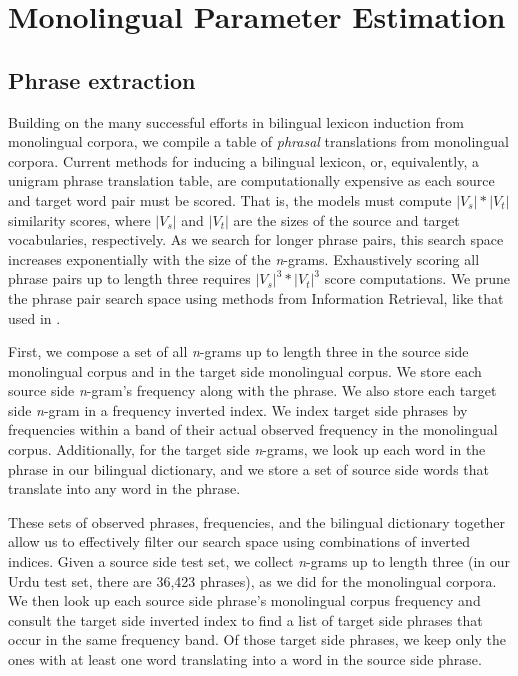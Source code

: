 \documentclass[11pt]{article}
\newcommand{\mnote}[1]{\marginpar{%
  \vskip-\baselineskip
  \raggedright\footnotesize
  \itshape\hrule\smallskip\tiny{#1}\par\smallskip\hrule}}
\newcommand{\mtodo}[1]{\mnote{\textcolor{red}{#1}}}
\begin{document}

\section{Monolingual Parameter Estimation} \label{sect:mono}

\subsection{Phrase extraction}  \label{sect:extract}

Building on the many successful efforts in bilingual lexicon induction from monolingual corpora, we compile a table of {\it phrasal} translations from monolingual corpora. Current methods for inducing a bilingual lexicon, or, equivalently, a unigram phrase translation table, are computationally expensive as each source and target word pair must be scored. That is, the models must  compute $|V_s| * |V_t|$ similarity scores, where $|V_s|$ and $|V_t|$ are the sizes of the source and target vocabularies, respectively. As we search for longer phrase pairs, this search space increases exponentially with the size of the  {\it n}-grams. Exhaustively scoring all phrase pairs up to length three requires $|V_s|^3 * |V_t|^3 $ score computations. We prune the phrase pair search space using methods from Information Retrieval, like that used in . 

First, we compose a set of all {\it n}-grams up to length three in the source side monolingual corpus and in the target side monolingual corpus. We store each source side {\it n}-gram's frequency along with the phrase. We also store each target side {\it n}-gram in a frequency inverted index. We index target side phrases by frequencies within a band of their actual observed frequency in the monolingual corpus. Additionally, for the target side {\it n}-grams, we look up each word in the phrase in our bilingual dictionary, and we store a set of source side words that translate into any word in the phrase. \mtodo{discuss dictionary(ies)}

These sets of observed phrases, frequencies, and the bilingual dictionary together allow us to effectively filter our search space using combinations of inverted indices. Given a source side test set, we collect  {\it n}-grams up to length three (in our Urdu test set, there are 36,423 phrases), as we did for the monolingual corpora. We then look up each source side phrase's monolingual corpus frequency and consult the target side inverted index to find a list of target side phrases that occur in the same frequency band. Of those target side phrases, we keep only the ones with at least one \mtodo{discuss dictionary parameters} word translating into a word in the source side phrase. 
\end{document}

